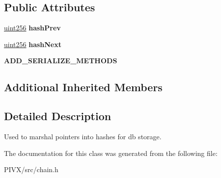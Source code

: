 \subsection*{Public Attributes}
\begin{DoxyCompactItemize}
\item 
\mbox{\label{class_c_disk_block_index_a3a1730201a8523fb947c4d4f632a4212}} 
\mbox{\hyperlink{classuint256}{uint256}} {\bfseries hash\+Prev}
\item 
\mbox{\label{class_c_disk_block_index_a0dda572f44335a5317de18001c3594a8}} 
\mbox{\hyperlink{classuint256}{uint256}} {\bfseries hash\+Next}
\item 
\mbox{\label{class_c_disk_block_index_adfa97e82f2e6db827fc6b8b5e351a1f9}} 
{\bfseries A\+D\+D\+\_\+\+S\+E\+R\+I\+A\+L\+I\+Z\+E\+\_\+\+M\+E\+T\+H\+O\+DS}
\end{DoxyCompactItemize}
\subsection*{Additional Inherited Members}


\subsection{Detailed Description}
Used to marshal pointers into hashes for db storage. 

The documentation for this class was generated from the following file\+:\begin{DoxyCompactItemize}
\item 
P\+I\+V\+X/src/chain.\+h\end{DoxyCompactItemize}
